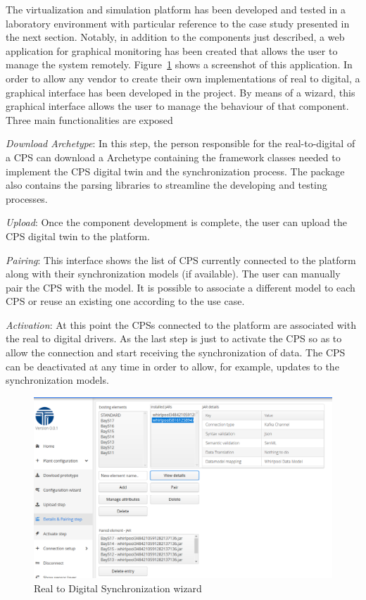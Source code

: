 The virtualization and simulation platform has been developed and tested in a laboratory environment with particular reference to the case study presented in the next section. Notably, in addition to the components just described, a web application for graphical monitoring has been created that allows the user to manage the system remotely. Figure~\ref{fig:wizard} shows a screenshot of this application. 
In order to allow any vendor to create their own implementations of real to digital, a graphical interface has been developed in the project. 
By means of a wizard, this graphical interface allows the user to manage the behaviour of that component. 
Three main functionalities are exposed
\begin{description}


\item \textit{Download Archetype}: In this step, the person responsible for the real-to-digital of a CPS can download a Archetype containing the framework classes needed to implement the CPS digital twin and the synchronization process. The package also contains the parsing libraries to streamline the developing and testing processes.
\item \textit{Upload}: Once the component development is complete, the user can upload the CPS digital twin to the platform.
\item \textit{Pairing}: This interface shows the list of CPS currently connected to the platform along with their synchronization models (if available). The user can manually pair the CPS with the model. It is possible to associate a different model to each CPS or reuse an existing one according to the use case.
\item \textit{Activation}: At this point the CPSs connected to the platform are associated with the real to digital drivers. As the last step is just to activate the CPS so as to allow the connection and start receiving the synchronization of data. The CPS can be deactivated at any time in order to allow, for example, updates to the synchronization models.
\end{description}

\begin{figure}
  \includegraphics[width=\linewidth]{images/wizard.PNG}
  \caption{Real to Digital Synchronization wizard}
  \label{fig:wizard}
\end{figure}





